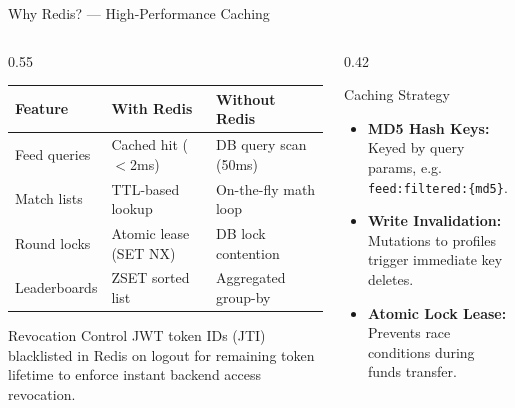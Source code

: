 \documentclass[aspectratio=169, 10pt]{beamer}
\begin{document}
\begin{frame}{Why Redis? — High-Performance Caching}
  \begin{columns}[T]
    \begin{column}{0.55\textwidth}
      \centering
      \footnotesize
      \begin{tabularx}{\textwidth}{lXX}
        \toprule
        \textbf{Feature} & \textbf{With Redis} & \textbf{Without Redis} \\
        \midrule
        Feed queries & Cached hit ($<$2ms) & DB query scan (50ms) \\
        Match lists & TTL-based lookup & On-the-fly math loop \\
        Round locks & Atomic lease (SET NX) & DB lock contention \\
        Leaderboards & ZSET sorted list & Aggregated group-by \\
        \bottomrule
      \end{tabularx}
      \vspace{1.5mm}
      \begin{infobox}{Revocation Control}
        JWT token IDs (JTI) blacklisted in Redis on logout for remaining token lifetime to enforce instant backend access revocation.
      \end{infobox}
    \end{column}
    \begin{column}{0.42\textwidth}
      \begin{scard}{Caching Strategy}
        \begin{itemize}\setlength{\itemsep}{0.5pt}
          \item \textbf{MD5 Hash Keys:} Keyed by query params, e.g. \texttt{feed:filtered:\{md5\}}.
          \item \textbf{Write Invalidation:} Mutations to profiles trigger immediate key deletes.
          \item \textbf{Atomic Lock Lease:} Prevents race conditions during funds transfer.
        \end{itemize}
      \end{scard}
    \end{column}
  \end{columns}
\end{frame}
\end{document}
